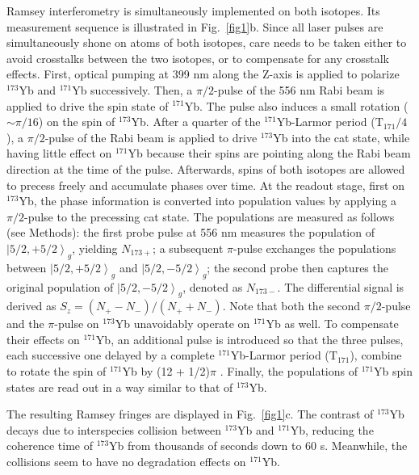 \documentclass[pdflatex,sn-nature,centre]{sn-jnl}%
\begin{document}
Ramsey interferometry is simultaneously implemented on both isotopes. Its measurement sequence is illustrated in Fig.~\ref{fig1}b. Since all laser pulses are simultaneously shone on atoms of both isotopes, care needs to be taken either to avoid crosstalks between the two isotopes, or to compensate for any crosstalk effects. First, optical pumping at 399 nm along the Z-axis is applied to polarize $^{173}$Yb and $^{171}$Yb successively. Then, a $\pi/2$-pulse of the 556 nm Rabi beam is applied to
drive the spin state of $^{171}$Yb. The pulse also induces a small rotation ($\sim\pi/16$) on the spin of $^{173}$Yb. After a quarter of the $^{171}$Yb-Larmor period ($\mathrm T_{171}/4$), a $\pi/2$-pulse of the Rabi beam is applied to drive $^{173}$Yb into the cat state, while having little effect on $^{171}$Yb because their spins are pointing along the Rabi beam direction at the time of the pulse. Afterwards, spins of both isotopes are allowed to precess freely and accumulate phases over time. At the readout stage, first on $^{173}$Yb, the phase information is converted into population values by applying a $\pi/2$-pulse to the precessing cat state. The populations are measured as follows (see Methods): the first probe pulse at 556 nm measures the population of $\left\vert5/2, +5/2\right\rangle_g$, yielding $N_{173+}$; a subsequent $\pi$-pulse exchanges the populations between $\left\vert5/2,+5/2\right\rangle_g$ and $\left\vert5/2,-5/2\right\rangle_g$; the second probe then captures the original population of $\left\vert5/2,-5/2\right\rangle_g$, denoted as $N_{173-}$. The differential signal is derived as $S_{z} = (N_{+}-N_{-})/(N_{+}+N_{-})$. Note that both the second $\pi/2$-pulse and the $\pi$-pulse on $^{173}$Yb unavoidably operate on $^{171}$Yb as well. To compensate their effects on $^{171}$Yb, an additional pulse is introduced so that the three pulses, each successive one delayed by a complete $^{171}$Yb-Larmor period ($\mathrm T_{171}$), combine to rotate the spin of $^{171}$Yb by (12 + 1/2)$\pi$ . Finally, the populations of $^{171}$Yb spin states are read out in a way similar to that of $^{173}$Yb.

The resulting Ramsey fringes are displayed in Fig.~\ref{fig1}c. The contrast of $^{173}$Yb decays due to interspecies collision between $^{173}$Yb and $^{171}$Yb, reducing the coherence time of $^{173}$Yb from thousands of seconds down to 60 s. Meanwhile, the collisions seem to have no degradation effects on $^{171}$Yb. 
\end{document}
